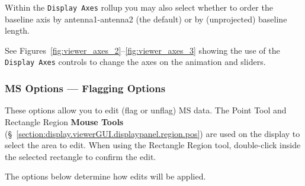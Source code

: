 Within the {\tt Display Axes} rollup you may also select whether to order
the baseline axis by antenna1-antenna2 (the default) or by (unprojected)
baseline length.

See Figures~\ref{fig:viewer_axes_2}--\ref{fig:viewer_axes_3}
showing the use of the {\tt Display Axes} controls to change the axes on the
animation and sliders.

\subsubsection{MS Options --- Flagging Options}
\label{section:display.ms.adjust.flagging}

These options allow you to edit (flag or unflag) MS data.
The Point Tool and Rectangle Region {\bf Mouse Tools}
(\S~\ref{section:display.viewerGUI.displaypanel.region.pos}) are used on
the display to select the area to edit.  When using the Rectangle Region
tool, double-click inside the selected rectangle to confirm the edit.

The options below determine how edits will be applied.

